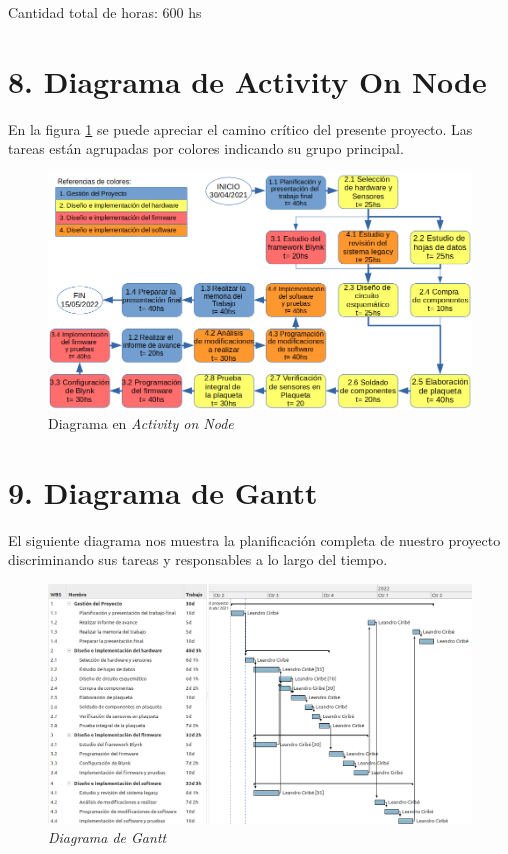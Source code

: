 \documentclass[
11pt, %
]{charter}
\begin{document}
Cantidad total de horas: 600 hs
\pagebreak
\section{8. Diagrama de Activity On Node}
\label{sec:AoN}
En la figura \ref{fig:AoN} se puede apreciar el camino crítico del presente proyecto. Las tareas están agrupadas por colores indicando su grupo principal.
\begin{figure}[htpb]
\centering 
\includegraphics[width=.9\textwidth]{./Figuras/AoN.png}
\caption{Diagrama en \textit{Activity on Node}}
\label{fig:AoN}
\end{figure}

\section{9. Diagrama de Gantt}
\label{sec:gantt}

El siguiente diagrama nos muestra la planificación completa de nuestro proyecto discriminando sus tareas y responsables a lo largo del tiempo.

\begin{figure}[htpb]
\centering 
\includegraphics[width=.9\textwidth]{./Figuras/gantt.png}
\caption{\textit{Diagrama de Gantt}}
\label{fig:gantt}
\end{figure}
\end{document}
